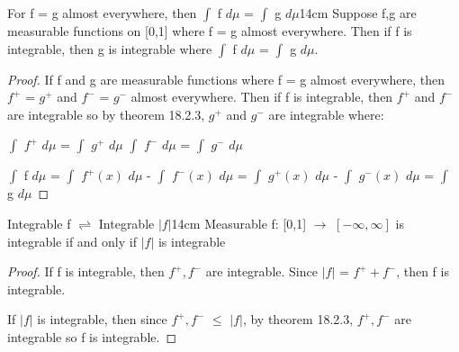     \vspace{0.5cm}



    \begin{wtheorem}{For f = g almost everywhere,
    then $\int$ f $d\mu$ = $\int$ g $d\mu$}{14cm}
        Suppose f,g are measurable functions on [0,1]
        where f = g almost everywhere. Then if f is integrable, then
        g is integrable where $\int$ f $d\mu$ = $\int$ g $d\mu$.
    \end{wtheorem}

    \begin{proof}
        If f and g are measurable functions where f = g almost everywhere,
        then $f^+$ = $g^+$ and $f^-$ = $g^-$ almost everywhere.
        Then if f is integrable, then $f^+$ and $f^-$ are integrable
        so by {\color{red} theorem 18.2.3}, $g^+$ and $g^-$ are integrable
        where:
        
        \hspace{0.5cm}
        $\int$ $f^+$ $d\mu$ = $\int$ $g^+$ $d\mu$
        \hspace{1cm}
        $\int$ $f^-$ $d\mu$ = $\int$ $g^-$ $d\mu$

        \hspace{0.5cm}
        $\int$ f $d\mu$
        = $\int$ $f^+(x)$ $d\mu$ - $\int$ $f^-(x)$ $d\mu$
        = $\int$ $g^+(x)$ $d\mu$ - $\int$ $g^-(x)$ $d\mu$
        = $\int$ g $d\mu$
    \end{proof}

    \vspace{0.5cm}



    \begin{wtheorem}{Integrable f $\rightleftharpoons$ Integrable $|f|$}{14cm}
        Measurable f: [0,1] $\rightarrow$ $[-\infty,\infty]$
        is integrable if and only if $|f|$ is integrable
    \end{wtheorem}

    \begin{proof}
        If f is integrable, then $f^+,f^-$
        are integrable. Since $|f|$ = $f^+ + f^-$, then f is integrable.

        If $|f|$ is integrable, then since $f^+,f^-$ $\leq$ $|f|$,
        by {\color{red} theorem 18.2.3}, $f^+,f^-$ are integrable
        so f is integrable.
    \end{proof}

    \vspace{0.5cm}




